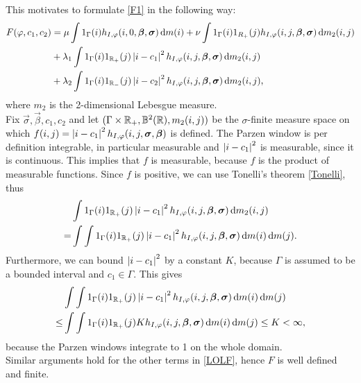 This motivates to formulate \eqref{F1} in the following way:
\begin{equation}
  \begin{split}
    F(\phi,c_1,c_2) &= \mu \int 1_\Gamma(i) h_{I,\phi}(i,0,\vec{\beta},\vec{\sigma})\df m(i) + \nu\int 1_{\Gamma}(i)1_{R_+}(j) h_{I,\phi}(i,j,\vec{\beta},\vec{\sigma})\df m_2(i,j)\\
    &+ \lambda_1\int 1_\Gamma(i) 1_{\R_+}(j) \abs{i-c_1}^2h_{I,\phi}(i,j,\vec{\beta},\vec{\sigma})\df m_2(i, j)\\
    &+ \lambda_2\int 1_\Gamma(i) 1_{\R_-}(j) \abs{i-c_2}^2h_{I,\phi}(i,j,\vec{\beta},\vec{\sigma})\df m_2(i, j),
  \end{split}\label{LOLF}
\end{equation}
where $m_2$ is the 2-dimensional Lebesgue measure.\\
Fix $\vec{\sigma}, \vec{\beta}, c_1, c_2$ and let $(\Gamma\times \mathbb R_+,\mathbb{B}^2(\mathbb R),m_2(i,j))$ be the $\sigma$-finite measure space on which $f(i,j) = \left| {i-c_1} \right|^2h_{I,\varphi}(i,j,\boldsymbol{\sigma} ,\boldsymbol{\beta} )$ is defined. The Parzen window is per definition integrable, in particular measurable and $\left| {i-c_1} \right|^2$ is measurable, since it is continuous. This implies that $f$ is measurable, because $f$ is the product of measurable functions. Since $f$ is positive, we can use Tonelli's theorem \eqref{Tonelli}, thus
\begin{equation}
  \begin{split}
    &\int 1_\Gamma(i) 1_{\mathbb R_+}(j) \left| {i-c_1} \right|^2h_{I,\varphi}(i,j,\boldsymbol{\beta} ,\boldsymbol{\sigma} )\,{\rm d} m_2(i, j)\\
    = &\int\int 1_\Gamma(i) 1_{\mathbb R_+}(j) \left| {i-c_1} \right|^2h_{I,\varphi}(i,j,\boldsymbol{\beta} ,\boldsymbol{\sigma} )\,{\rm d} m(i) \,{\rm d} m(j).
  \end{split}
\end{equation}
Furthermore, we can bound $\left| {i-c_1} \right|^2$ by a constant $K$, because $\Gamma$ is assumed to be a bounded interval and $c_1\in\Gamma$. This gives
\begin{equation}
  \begin{split}
    &\int\int 1_\Gamma(i) 1_{\mathbb R_+}(j) \left| {i-c_1} \right|^2h_{I,\varphi}(i,j,\boldsymbol{\beta} ,\boldsymbol{\sigma} )\,{\rm d} m(i) \,{\rm d} m(j)\\
    \leq &\int\int 1_\Gamma(i) 1_{\mathbb R_+}(j) K h_{I,\varphi}(i,j,\boldsymbol{\beta} ,\boldsymbol{\sigma} )\,{\rm d} m(i) \,{\rm d} m(j) \leq K < \infty,
  \end{split}
\end{equation}
because the Parzen windows integrate to 1 on the whole domain.\\
Similar arguments hold for the other terms in \eqref{LOLF}, hence $F$ is well defined and finite.\\

